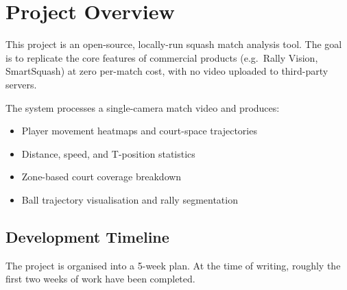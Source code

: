 \documentclass[12pt,a4paper]{article}
\begin{document}
\newpage

\thispagestyle{fancy}
\tableofcontents
\newpage

\section{Project Overview}

This project is an open-source, locally-run squash match analysis tool. The goal is to replicate the core features of commercial products (e.g.\ Rally Vision, SmartSquash) at zero per-match cost, with no video uploaded to third-party servers.

The system processes a single-camera match video and produces:
\begin{itemize}
    \item Player movement heatmaps and court-space trajectories
    \item Distance, speed, and T-position statistics
    \item Zone-based court coverage breakdown
    \item Ball trajectory visualisation and rally segmentation
\end{itemize}

\subsection*{Development Timeline}

The project is organised into a 5-week plan. At the time of writing, roughly the first two weeks of work have been completed.
\end{document}

